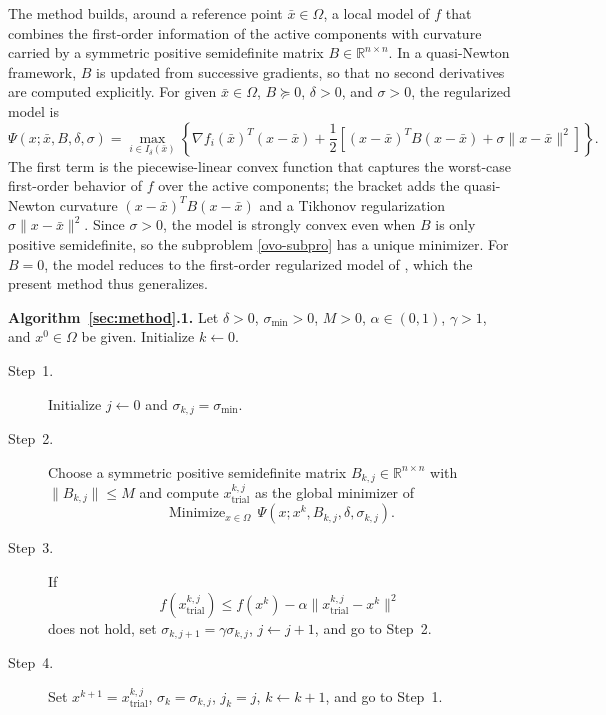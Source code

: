 \documentclass[11pt]{article}
\newcommand{\xkjtrial}{x^{k,j}_{\mathrm{trial}}}
\newcommand{\minimize}{\mathop{\text{Minimize}}}
\begin{document}
The method builds, around a reference point $\bar{x} \in \Omega$, a local model
of $f$ that combines the first-order information of the active components with
curvature carried by a symmetric positive semidefinite matrix
$B \in \mathbb{R}^{n \times n}$. In a quasi-Newton framework, $B$ is updated
from successive gradients, so that no second derivatives are computed
explicitly. For given $\bar{x} \in \Omega$, $B \succeq 0$, $\delta > 0$, and
$\sigma > 0$, the regularized model is
\begin{equation}
    \Psi(x; \bar{x}, B, \delta, \sigma) =
    \max_{i \in I_\delta(\bar{x})}
    \left\lbrace \nabla f_i(\bar{x})^T(x - \bar{x}) 
    + \frac{1}{2} \left[ (x - \bar{x})^T B (x - \bar{x})
    + \sigma \|x - \bar{x}\|^2 \right]\right\rbrace. \label{model}
\end{equation}
The first term is the piecewise-linear convex function that captures the
worst-case first-order behavior of $f$ over the active components; the bracket
adds the quasi-Newton curvature $(x - \bar{x})^T B (x - \bar{x})$ and a
Tikhonov regularization $\sigma \|x - \bar{x}\|^2$. Since $\sigma > 0$, the
model is strongly convex even when $B$ is only positive semidefinite, so the
subproblem \eqref{ovo-subpro} has a unique minimizer. For $B = 0$, the model
reduces to the first-order regularized model of \cite{alvarezovo}, which the
present method thus generalizes.

\medskip
\noindent\textbf{Algorithm~\ref{sec:method}.1.} Let $\delta > 0$,
$\sigma_{\min} > 0$, $M > 0$, $\alpha \in (0,1)$, $\gamma > 1$, and
$x^0 \in \Omega$ be given. Initialize $k \leftarrow 0$.
\begin{description}
\item[Step~1.] Initialize $j \leftarrow 0$ and $\sigma_{k,j} = \sigma_{\min}$.
\item[Step~2.] Choose a symmetric positive semidefinite matrix
$B_{k,j} \in \mathbb{R}^{n \times n}$ with $\|B_{k,j}\| \leq M$ and compute
$\xkjtrial$ as the global minimizer of
    \begin{equation} \label{ovo-subpro}
    \minimize_{x \in \Omega}\, \Psi(x; x^k, B_{k,j}, \delta, \sigma_{k,j}).
    \end{equation}
\item[Step~3.] If
    \begin{equation} \label{ovo-armijo}
    f(\xkjtrial) \leq f(x^k) - \alpha \|\xkjtrial - x^k\|^2
    \end{equation}
does not hold, set $\sigma_{k,j+1} = \gamma \sigma_{k,j}$,
$j \leftarrow j + 1$, and go to Step~2.
\item[Step~4.] Set $x^{k+1} = \xkjtrial$, $\sigma_k = \sigma_{k,j}$,
$j_k = j$, $k \leftarrow k+1$, and go to Step~1.
\end{description}
\end{document}
